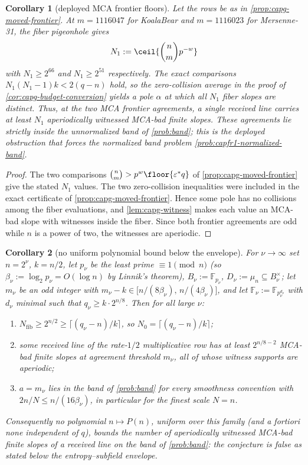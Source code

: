 \documentclass[11pt]{article}
\newtheorem{corollary}[corollary]{Corollary}
\theoremstyle{definition}
\theoremstyle{remark}
\newcommand{\F}{\mathbb{F}}
\begin{document}
\begin{corollary}[deployed MCA frontier floors]
\label{cor:capg-deployed-floor}
Let the rows be as in \cref{prop:capg-moved-frontier}.  At
$m=1116047$ for KoalaBear and $m=1116023$ for Mersenne-31, the fiber
pigeonhole gives
\[
        N_1:=\ceil{\binom nm p^{-w}}
\]
with $N_1\ge2^{66}$ and $N_1\ge2^{51}$ respectively.  The exact comparisons
$N_1(N_1-1)k<2(q-n)$ hold, so the zero-collision average in the proof of
\cref{cor:capg-budget-conversion} yields a pole $\alpha$ at which all $N_1$
fiber slopes are distinct.  Thus, at the two MCA frontier agreements, a
single received line carries at least $N_1$ aperiodically witnessed MCA-bad
finite slopes.  These agreements lie strictly inside the unnormalized band of
\cref{prob:band}; this is the deployed obstruction that forces the normalized
band problem \cref{prob:capfr1-normalized-band}.
\end{corollary}

\begin{proof}
The two comparisons $\binom nm>p^{w}\floor{\varepsilon^*q}$ of
\cref{prop:capg-moved-frontier} give the stated $N_1$ values.  The two
zero-collision inequalities were included in the exact certificate of
\cref{prop:capg-moved-frontier}.  Hence some pole has no collisions among the
fiber evaluations, and \cref{lem:capg-witness} makes each value an MCA-bad
slope with witnesses inside the fiber.  Since both frontier agreements are
odd while $n$ is a power of two, the witnesses are aperiodic.
\end{proof}


\begin{corollary}[no uniform polynomial bound below the
envelope]\label{cor:capg-asymptotic}
For $\nu\to\infty$ set $n=2^{\nu}$, $k=n/2$, let $p_\nu$ be the least prime
$\equiv 1\pmod n$ (so $\beta_\nu:=\log_2 p_\nu=O(\log n)$ by Linnik's
theorem), $B_\nu:=\F_{p_\nu}$, $D_\nu:=\mu_n\subseteq B_\nu^{\times}$; let
$m_\nu$ be an odd integer with
$m_\nu-k\in\big[n/(8\beta_\nu),\,n/(4\beta_\nu)\big]$, and let
$\F_\nu:=\F_{p_\nu^{d_\nu}}$ with $d_\nu$ minimal such that
$q_\nu\geq k\cdot 2^{n/8}$.  Then for all large $\nu$:
\begin{enumerate}[label=(\alph*)]
\item $N_{\mathrm{fib}}\geq 2^{n/2}\geq\lceil(q_\nu-n)/k\rceil$, so
$N_0=\lceil(q_\nu-n)/k\rceil$;
\item some received line of the rate-$1/2$ multiplicative row has at least
$2^{n/8-2}$ MCA-bad finite slopes at agreement threshold $m_\nu$, all of
whose witness supports are aperiodic;
\item $a=m_\nu$ lies in the band of \cref{prob:band} for every smoothness
convention with $2n/N\leq n/(16\beta_\nu)$, in particular for the finest
scale $N=n$.
\end{enumerate}
Consequently no polynomial $n\mapsto P(n)$, uniform over this family (and a
fortiori none independent of $q$), bounds the number of aperiodically
witnessed MCA-bad finite slopes of a received line on the band of
\cref{prob:band}: the conjecture is false as stated below the
entropy--subfield envelope.
\end{corollary}
\end{document}
